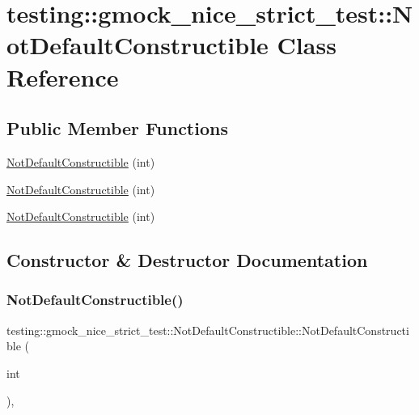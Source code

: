 \hypertarget{classtesting_1_1gmock__nice__strict__test_1_1_not_default_constructible}{}\section{testing\+::gmock\+\_\+nice\+\_\+strict\+\_\+test\+::Not\+Default\+Constructible Class Reference}
\label{classtesting_1_1gmock__nice__strict__test_1_1_not_default_constructible}
\subsection*{Public Member Functions}
\begin{DoxyCompactItemize}
\item 
\mbox{\hyperlink{classtesting_1_1gmock__nice__strict__test_1_1_not_default_constructible_acfaca2e03925805192b698708d6030bc}{Not\+Default\+Constructible}} (int)
\item 
\mbox{\hyperlink{classtesting_1_1gmock__nice__strict__test_1_1_not_default_constructible_acfaca2e03925805192b698708d6030bc}{Not\+Default\+Constructible}} (int)
\item 
\mbox{\hyperlink{classtesting_1_1gmock__nice__strict__test_1_1_not_default_constructible_acfaca2e03925805192b698708d6030bc}{Not\+Default\+Constructible}} (int)
\end{DoxyCompactItemize}


\subsection{Constructor \& Destructor Documentation}
\mbox{\label{classtesting_1_1gmock__nice__strict__test_1_1_not_default_constructible_acfaca2e03925805192b698708d6030bc}} 
\subsubsection{\texorpdfstring{NotDefaultConstructible()}{NotDefaultConstructible()}\hspace{0.1cm}{\footnotesize\ttfamily [1/3]}}
{\footnotesize\ttfamily testing\+::gmock\+\_\+nice\+\_\+strict\+\_\+test\+::\+Not\+Default\+Constructible\+::\+Not\+Default\+Constructible (\begin{DoxyParamCaption}\item[{int}]{ }\end{DoxyParamCaption})\hspace{0.3cm}{\ttfamily [inline]}, {\ttfamily [explicit]}}

